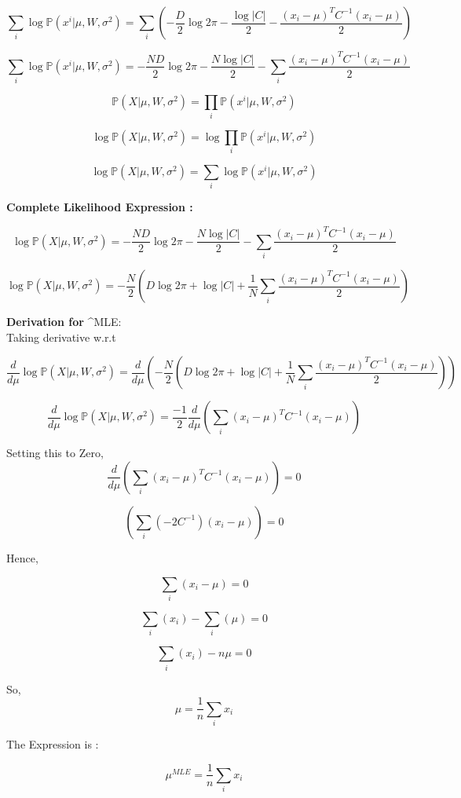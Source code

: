 \documentclass[a4paper,11pt]{article}
\begin{document}
\begin{mlsolution}
\[
\sum_i \log\mathbb{P}(x^i | \mu, W, \sigma^2) = 
\sum_i \left (
-\frac{D}{2}\log2\pi - \frac{\log|C|}{2}   -\frac{(x_i - \mu)^TC^{-1}(x_i - \mu)}{2} \right )
\]

\[
\sum_i \log\mathbb{P}(x^i | \mu, W, \sigma^2) = 
-\frac{ND}{2}\log2\pi - \frac{N\log|C|}{2} - \sum_i\frac{(x_i - \mu)^TC^{-1}(x_i - \mu)}{2}
\]

\[
\mathbb{P}(X | \mu, W, \sigma^2) = \prod_i\mathbb{P}(x^i | \mu, W, \sigma^2) 
\]

\[
\log \mathbb{P}(X | \mu, W, \sigma^2) = \log \prod_i\mathbb{P}(x^i | \mu, W, \sigma^2) 
\]

\[
\log \mathbb{P}(X | \mu, W, \sigma^2) = \sum_i \log \mathbb{P}(x^i | \mu, W, \sigma^2) 
\]

\textbf{Complete Likelihood Expression : }

\[
\log \mathbb{P}(X | \mu, W, \sigma^2) =-\frac{ND}{2}\log2\pi - \frac{N\log|C|}{2} - \sum_i\frac{(x_i - \mu)^TC^{-1}(x_i - \mu)}{2}
\]

\[
\log \mathbb{P}(X | \mu, W, \sigma^2) =-\frac{N}{2} \left ( D\log2\pi + \log|C| + \frac{1}{N}\sum_i\frac{(x_i - \mu)^TC^{-1}(x_i - \mu)}{2} \right )
\]

\textbf{Derivation for } \textbf{\mu}^{MLE}:\\

Taking derivative w.r.t \mu

\[
\frac{d}{d\mu} \log \mathbb{P}(X | \mu, W, \sigma^2) = \frac{d}{d\mu} \left ( -\frac{N}{2} \left ( D\log2\pi + \log|C| + \frac{1}{N}\sum_i\frac{(x_i - \mu)^TC^{-1}(x_i - \mu)}{2} \right ) \right )
\]

\[
\frac{d}{d\mu} \log \mathbb{P}(X | \mu, W, \sigma^2) = \frac{-1}{2} \frac{d}{d\mu} \left ( \sum_i (x_i - \mu)^TC^{-1}(x_i - \mu) \right )
\]

Setting this to Zero,
\[
\frac{d}{d\mu} \left ( \sum_i (x_i - \mu)^TC^{-1}(x_i - \mu) \right ) = 0
\]

\[
\left ( \sum_i (-2 C^{-1})(x_i - \mu) \right ) = 0
\]

Hence,

\[
\sum_i (x_i - \mu) = 0
\]

\[
\sum_i (x_i) - \sum_i (\mu) = 0
\]

\[
\sum_i (x_i) - n\mu = 0
\]

So,
\[
\mu = \frac{1}{n}\sum_i x_i
\]

The Expression is :

\[
\mu^{MLE} = \frac{1}{n}\sum_i x_i
\]

\end{mlsolution}
\end{document}
